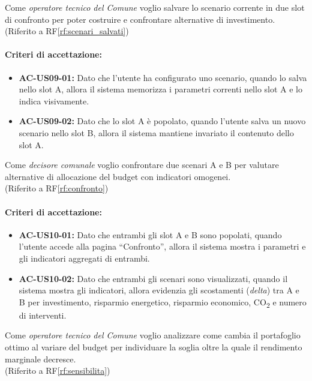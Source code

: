  \label{us:salva_ab}
Come \textit{operatore tecnico del Comune} voglio salvare lo scenario corrente in due slot di confronto per poter costruire e confrontare alternative di investimento. \\ (Riferito a RF\ref{rf:scenari_salvati})

\paragraph{Criteri di accettazione:}
\begin{itemize}
    \item \textbf{AC-US09-01:} Dato che l'utente ha configurato uno scenario, quando lo salva nello slot A, allora il sistema memorizza i parametri correnti nello slot A e lo indica visivamente.
    \item \textbf{AC-US09-02:} Dato che lo slot A è popolato, quando l'utente salva un nuovo scenario nello slot B, allora il sistema mantiene invariato il contenuto dello slot A.
\end{itemize}

 \label{us:confronto}
Come \textit{decisore comunale} voglio confrontare due scenari A e B per valutare alternative di allocazione del budget con indicatori omogenei. \\ (Riferito a RF\ref{rf:confronto})

\paragraph{Criteri di accettazione:}
\begin{itemize}
    \item \textbf{AC-US10-01:} Dato che entrambi gli slot A e B sono popolati, quando l'utente accede alla pagina ``Confronto'', allora il sistema mostra i parametri e gli indicatori aggregati di entrambi.
    \item \textbf{AC-US10-02:} Dato che entrambi gli scenari sono visualizzati, quando il sistema mostra gli indicatori, allora evidenzia gli scostamenti (\emph{delta}) tra A e B per investimento, risparmio energetico, risparmio economico, CO\textsubscript{2} e numero di interventi.
\end{itemize}

 \label{us:sensibilita}
Come \textit{operatore tecnico del Comune} voglio analizzare come cambia il portafoglio ottimo al variare del budget per individuare la soglia oltre la quale il rendimento marginale decresce. \\ (Riferito a RF\ref{rf:sensibilita})


